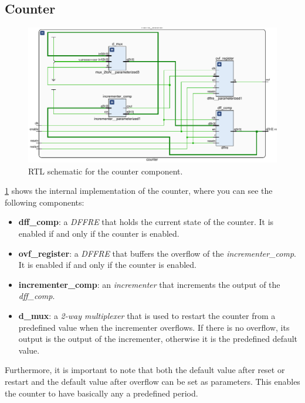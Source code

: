 \subsection{Counter}
\begin{figure}[]
  \centering
  \includegraphics[width=\textwidth]{figs/counter_schematic.pdf}
  \caption{RTL schematic for the counter component.}
  \label{fig:counter}
\end{figure}

\cref{fig:counter} shows the internal implementation of the counter, where you 
can see the following components:
\begin{itemize}
  \item \textbf{dff\_comp}: a \emph{DFFRE} that holds the current state of the 
    counter. It is enabled if and only if the counter is enabled.
  \item \textbf{ovf\_register}: a \emph{DFFRE} that buffers the overflow of the 
    \emph{incrementer\_comp}. It is enabled if and only if the counter is enabled.
  \item \textbf{incrementer\_comp}: an \emph{incrementer} that increments the 
    output of the \emph{dff\_comp}.
  \item \textbf{d\_mux}: a \emph{2-way multiplexer} that is used to restart the 
    counter from a predefined value when the incrementer overflows. If there is 
    no overflow, its output is the output of the incrementer, otherwise it is 
    the predefined default value.
\end{itemize}

Furthermore, it is important to note that both the default value after reset 
or restart and the default value after overflow can be set as parameters. 
This enables the counter to have basically any a predefined period.

